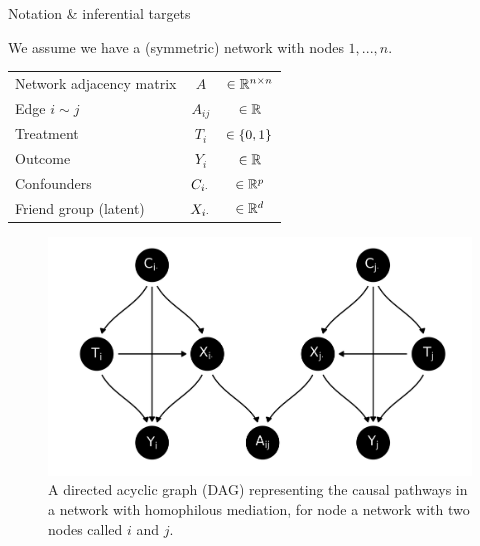 \documentclass[final]{beamer}
\newlength{\colwidth}
\begin{document}
\begin{frame}[t]
\begin{columns}[t]
\begin{column}{\colwidth}
      \begin{block}{Notation \& inferential targets}

        \begin{minipage}{.5\textwidth}

          \centering

          We assume we have a (symmetric) network with nodes $1, ..., n$.

          \vspace{1cm}

          \begin{table}[]
            \begin{tabular}{lcc}
              Network adjacency matrix & $A$            & $\in \mathbb{R}^{n \times n}$ \\
              Edge $i \sim j$          & $A_{ij}$       & $\in \mathbb{R}$              \\
              Treatment                & $T_i$          & $\in \{0, 1\} $     \\
              Outcome                  & $Y_i$          & $\in \mathbb{R}$              \\
              Confounders              & $C_{i \cdot}$ & $\in \mathbb{R}^p$            \\
              Friend group (latent)    & $X_{i \cdot}$ & $\in \mathbb{R}^d$
            \end{tabular}
          \end{table}

        \end{minipage}
        \begin{minipage}{.5\textwidth}

          \begin{figure}[ht]
            \centering
            \includegraphics[width=\textwidth]{figures/dags/full_mediating.png}
            \caption{A directed acyclic graph (DAG) representing the causal pathways in a network with homophilous mediation, for node a network with two nodes called $i$ and $j$.}
            \label{fig:mediating}
          \end{figure}


\end{minipage}
\end{block}
\end{column}
\end{columns}
\end{frame}
\end{document}
